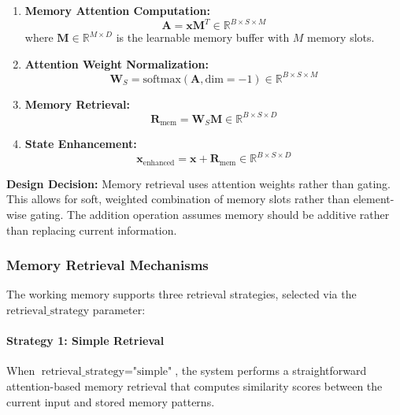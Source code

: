 \documentclass{article}
\begin{document}
\begin{enumerate}
\item \textbf{Memory Attention Computation:}
\begin{equation}
\mathbf{A} = \mathbf{x} \mathbf{M}^T \in \mathbb{R}^{B \times S \times M}
\end{equation}
where $\mathbf{M} \in \mathbb{R}^{M \times D}$ is the learnable memory buffer with $M$ memory slots.

\item \textbf{Attention Weight Normalization:}
\begin{equation}
\mathbf{W}_S = \text{softmax}(\mathbf{A}, \text{dim}=-1) \in \mathbb{R}^{B \times S \times M}
\end{equation}

\item \textbf{Memory Retrieval:}
\begin{equation}
\mathbf{R}_{\text{mem}} = \mathbf{W}_S \mathbf{M} \in \mathbb{R}^{B \times S \times D}
\end{equation}

\item \textbf{State Enhancement:}
\begin{equation}
\mathbf{x}_{\text{enhanced}} = \mathbf{x} + \mathbf{R}_{\text{mem}} \in \mathbb{R}^{B \times S \times D}
\end{equation}
\end{enumerate}

\textbf{Design Decision:} Memory retrieval uses attention weights rather than gating. This allows for soft, weighted combination of memory slots rather than element-wise gating. The addition operation assumes memory should be additive rather than replacing current information.

\subsubsection{Memory Retrieval Mechanisms}

The working memory supports three retrieval strategies, selected via the $\text{retrieval\_strategy}$ parameter:

\paragraph{Strategy 1: Simple Retrieval}

When $\text{retrieval\_strategy} = \text{"simple"}$, the system performs a straightforward attention-based memory retrieval that computes similarity scores between the current input and stored memory patterns.
\end{document}
